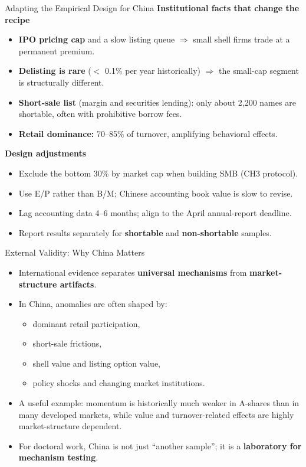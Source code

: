 \documentclass{beamer}
\begin{document}
\begin{frame}{Adapting the Empirical Design for China}
	\textbf{Institutional facts that change the recipe}
	\begin{itemize}
		\item \textbf{IPO pricing cap} and a slow listing queue $\Rightarrow$ small shell firms trade at a permanent premium.
		\item \textbf{Delisting is rare} ($<$ 0.1\% per year historically) $\Rightarrow$ the small-cap segment is structurally different.
		\item \textbf{Short-sale list} (margin and securities lending): only about 2{,}200 names are shortable, often with prohibitive borrow fees.
		\item \textbf{Retail dominance:} 70--85\% of turnover, amplifying behavioral effects.
	\end{itemize}

	\vspace{0.2cm}
	\textbf{Design adjustments}
	\begin{itemize}
		\item Exclude the bottom 30\% by market cap when building SMB (CH3 protocol).
		\item Use E/P rather than B/M; Chinese accounting book value is slow to revise.
		\item Lag accounting data 4--6 months; align to the April annual-report deadline.
		\item Report results separately for \textbf{shortable} and \textbf{non-shortable} samples.
	\end{itemize}
\end{frame}

\begin{frame}{External Validity: Why China Matters}
	\begin{itemize}
		\item International evidence separates \textbf{universal mechanisms} from \textbf{market-structure artifacts}.
		\item In China, anomalies are often shaped by:
		\begin{itemize}
			\item dominant retail participation,
			\item short-sale frictions,
			\item shell value and listing option value,
			\item policy shocks and changing market institutions.
		\end{itemize}
		\item A useful example: momentum is historically much weaker in A-shares than in many developed markets, while value and turnover-related effects are highly market-structure dependent.
		\item For doctoral work, China is not just ``another sample''; it is a \textbf{laboratory for mechanism testing}.
	\end{itemize}
\end{frame}
\end{document}
